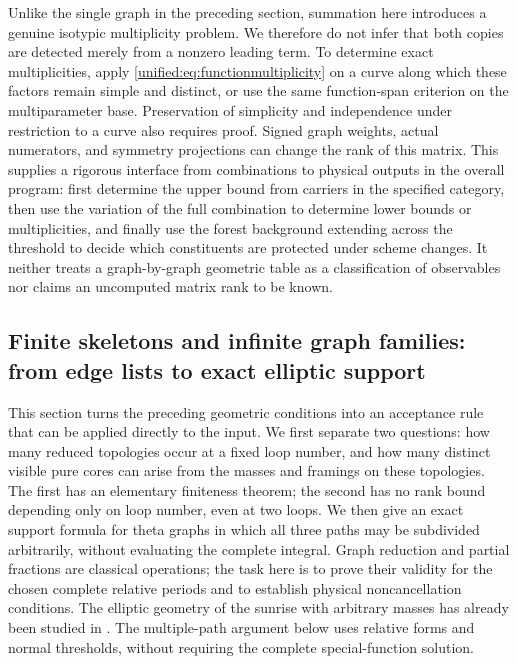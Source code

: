 \documentclass[11pt,a4paper,oneside]{article}
\theoremstyle{plain}
\theoremstyle{definition}
\theoremstyle{remark}
\numberwithin{equation}{section}
\begin{document}
Unlike the single graph in the preceding section, summation here introduces a genuine isotypic multiplicity problem.
We therefore do not infer that both copies are detected merely from a nonzero leading term.
To determine exact multiplicities, apply \eqref{unified:eq:functionmultiplicity} on a curve
along which these factors remain simple and distinct, or use the same function-span criterion on the multiparameter base.
Preservation of simplicity and independence under restriction to a curve also requires proof.
Signed graph weights, actual numerators, and symmetry projections can change the rank of this matrix.
This supplies a rigorous interface from combinations to physical outputs in the overall program:
first determine the upper bound from carriers in the specified category, then use the variation of the full combination to determine lower bounds or multiplicities,
and finally use the forest background extending across the threshold to decide which constituents are protected under scheme changes.
It neither treats a graph-by-graph geometric table as a classification of observables nor claims an uncomputed matrix rank to be known.



\subsection{Finite skeletons and infinite graph families: from edge lists to exact elliptic support}
\label{unified:sec:finitecores}
This section turns the preceding geometric conditions into an acceptance rule that can be applied directly to the input.
We first separate two questions: how many reduced topologies occur at a fixed loop number, and how many distinct visible pure cores
can arise from the masses and framings on these topologies. The first has an elementary finiteness theorem; the second has no
rank bound depending only on loop number, even at two loops. We then give an exact support formula for theta graphs
in which all three paths may be subdivided arbitrarily, without evaluating the complete integral. Graph reduction and partial fractions are classical operations;
the task here is to prove their validity for the chosen complete relative periods and to establish physical noncancellation conditions.
The elliptic geometry of the sunrise with arbitrary masses has already been studied in \cite{abwsun,bkvsunset}.
The multiple-path argument below uses relative forms and normal thresholds, without requiring the complete special-function solution.
\end{document}
